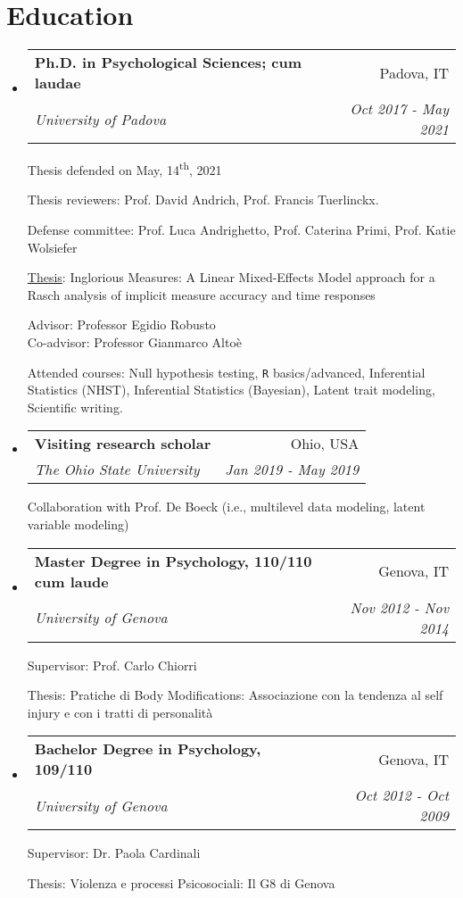 \documentclass[letterpaper,12pt]{article}
\makeatletter
\newcommand{\resumeSubheading}[4]{
  \vspace{-1pt}\item
    \begin{tabular*}{0.97\textwidth}{l@{\extracolsep{\fill}}r}
      \textbf{#1} & #2 \\
      \textit{\small#3} & \textit{\small #4} \\
    \end{tabular*}\vspace{-5pt}
}
\newcommand{\resumeSubHeadingListStart}{\begin{itemize}[leftmargin=*]}
\newcommand{\resumeSubHeadingListEnd}{\end{itemize}}
\makeatother
\begin{document}
\section{Education}
\resumeSubHeadingListStart
\resumeSubheading
{Ph.D. in Psychological Sciences; cum laudae}{Padova, IT}{University of Padova}
{Oct 2017 - May 2021}

{\small Thesis defended on May, 14\textsuperscript{th}, 2021}

{\small Thesis reviewers: Prof. David Andrich, Prof. Francis Tuerlinckx. }

{\small Defense committee: Prof. Luca Andrighetto, Prof. Caterina Primi, Prof. Katie Wolsiefer}

{\small \href{https://ottaviae.github.io/presentations/PhD-Thesis/EpifaniaPhDThesis.pdf}{Thesis}: Inglorious Measures: A Linear Mixed-Effects Model approach for a Rasch analysis of implicit measure accuracy and time responses}

{\small Advisor: Professor Egidio Robusto \\ Co-advisor: Professor Gianmarco Altoè }

{\small Attended courses: Null hypothesis testing, \texttt{R} basics/advanced, Inferential Statistics (NHST), Inferential Statistics (Bayesian), Latent trait modeling, Scientific writing.}



\resumeSubheading
{Visiting research scholar}{Ohio, USA}{The Ohio State University}
{Jan 2019 - May 2019}

{\small Collaboration with Prof. De Boeck (i.e., multilevel data modeling, latent variable modeling)}

\resumeSubheading{Master Degree in Psychology, 110/110 cum laude}{Genova, IT}{University of Genova}
{Nov 2012 - Nov 2014}

{\small Supervisor: Prof. Carlo Chiorri}

{\small Thesis: Pratiche di Body Modifications: Associazione con la tendenza al self injury e con i tratti di personalità}

\resumeSubheading{Bachelor Degree in Psychology, 109/110}{Genova, IT}{University of Genova}
{Oct 2012 - Oct 2009}

{\small Supervisor: Dr. Paola Cardinali}

{\small Thesis: Violenza e processi Psicosociali: Il G8 di Genova}

\resumeSubHeadingListEnd

\end{document}
